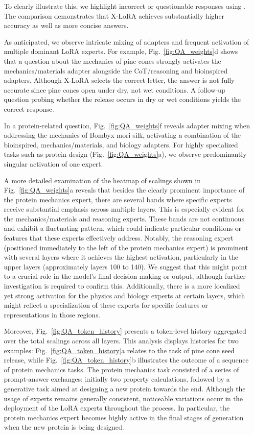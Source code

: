 To clearly illustrate this, we highlight incorrect or questionable responses using . The comparison demonstrates that X-LoRA achieves substantially higher accuracy as well as more concise answers.

As anticipated, we observe intricate mixing of adapters and frequent activation of multiple dominant LoRA experts. For example, Fig.~\ref{fig:QA_weights}d shows that a question about the mechanics of pine cones strongly activates the mechanics/materials adapter alongside the CoT/reasoning and bioinspired adapters. Although X-LoRA selects the correct letter, the answer is not fully accurate since pine cones open under dry, not wet conditions. A follow-up question probing whether the release occurs in dry or wet conditions yields the correct response.

In a protein-related question, Fig.~\ref{fig:QA_weights}f reveals adapter mixing when addressing the mechanics of Bombyx mori silk, activating a combination of the bioinspired, mechanics/materials, and biology adapters. For highly specialized tasks such as protein design (Fig.~\ref{fig:QA_weights}a), we observe predominantly singular activation of one expert.

A more detailed examination of the heatmap of scalings shown in Fig.~\ref{fig:QA_weights}a reveals that besides the clearly prominent importance of the protein mechanics expert, there are several bands where specific experts receive substantial emphasis across multiple layers. This is especially evident for the mechanics/materials and reasoning experts. These bands are not continuous and exhibit a fluctuating pattern, which could indicate particular conditions or features that these experts effectively address. Notably, the reasoning expert (positioned immediately to the left of the protein mechanics expert) is prominent with several layers where it achieves the highest activation, particularly in the upper layers (approximately layers 100 to 140). We suggest that this might point to a crucial role in the model’s final decision-making or output, although further investigation is required to confirm this. Additionally, there is a more localized yet strong activation for the physics and biology experts at certain layers, which might reflect a specialization of these experts for specific features or representations in those regions.

Moreover, Fig.~\ref{fig:QA_token_history} presents a token-level history aggregated over the total scalings across all layers. This analysis displays histories for two examples: Fig.~\ref{fig:QA_token_history}a relates to the task of pine cone seed release, while Fig.~\ref{fig:QA_token_history}b illustrates the outcome of a sequence of protein mechanics tasks. The protein mechanics task consisted of a series of prompt-answer exchanges: initially two property calculations, followed by a generative task aimed at designing a new protein towards the end. Although the usage of experts remains generally consistent, noticeable variations occur in the deployment of the LoRA experts throughout the process. In particular, the protein mechanics expert becomes highly active in the final stages of generation when the new protein is being designed.

